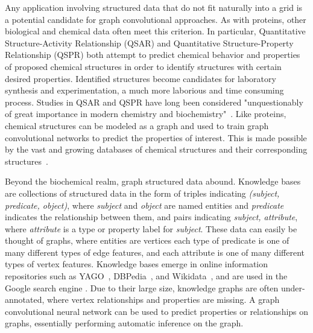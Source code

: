 Any application involving structured data that do not fit naturally into a grid is a potential candidate for graph convolutional approaches.
As with proteins, other biological and chemical data often meet this criterion.
In particular, Quantitative Structure-Activity Relationship (QSAR) and Quantitative Structure-Property Relationship (QSPR) both attempt to predict chemical behavior and properties of proposed chemical structures in order to identify structures with certain desired properties. 
Identified structures become candidates for laboratory synthesis and experimentation, a much more laborious and time consuming process. 
Studies in QSAR and QSPR have long been considered "unquestionably of great importance in modern chemistry and biochemistry"~\cite{karelson1996}.
Like proteins, chemical structures can be modeled as a graph and used to train graph convolutional networks to predict the properties of interest.
This is made possible by the vast and growing databases of chemical structures and their corresponding structures~\cite{olah2008, judson2008}.

Beyond the biochemical realm, graph structured data abound.
Knowledge bases are collections of structured data in the form of triples indicating \emph{(subject, predicate, object)}, where \emph{subject} and \emph{object} are named entities and \emph{predicate} indicates the relationship between them, and pairs indicating \emph{subject, attribute}, where \emph{attribute} is a type or property label for \emph{subject}.
These data can easily be thought of graphs, where entities are vertices each type of predicate is one of many different types of edge features, and each attribute is one of many different types of vertex features.
Knowledge bases emerge in online information repositories such as YAGO~\cite{mahdisoltani2014}, DBPedia~\cite{auer2007}, and Wikidata~\cite{vrandevcic2014}, and are used in the Google search engine \cite{singhal2012}.
Due to their large size, knowledge graphs are often under-annotated, where vertex relationships and properties are missing. 
A graph convolutional neural network can be used to predict properties or relationships on graphs, essentially performing automatic inference on the graph.



